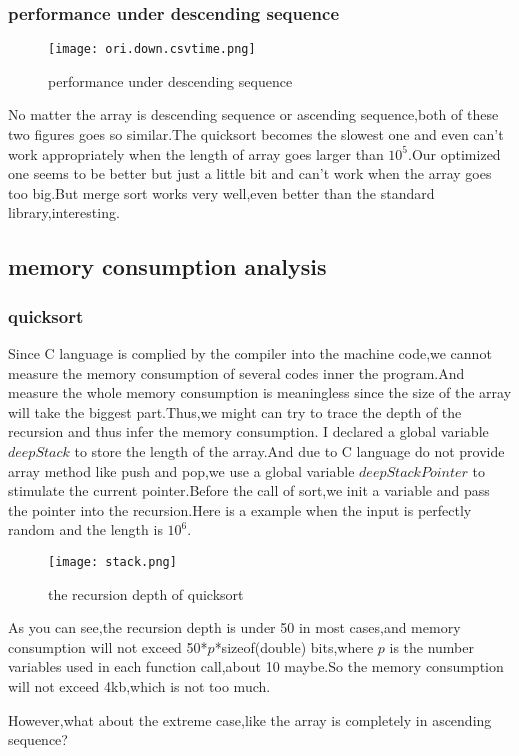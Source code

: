 \documentclass[11pt]{scrartcl} %
\begin{document}
	\subsubsection{performance under descending sequence }
	\begin{figure}[H]
		\centering
		\texttt{[image: ori.down.csvtime.png]}
		\caption{performance under descending sequence}
		\label{}
	\end{figure}
	No matter the array is descending sequence or ascending sequence,both of these two figures goes so similar.The quicksort becomes the slowest one and even can't work appropriately when the length of array goes larger than $10^5$.Our optimized one seems to be better but just a little bit and can't work when the array goes too big.But merge sort works very well,even better than the standard library,interesting.
	\subsection{memory consumption analysis}
	\subsubsection{quicksort}
	Since C language is complied by the compiler into the machine code,we cannot measure the memory consumption of several codes inner the program.And measure the whole memory consumption is meaningless since the size of the array will take the biggest part.Thus,we might can try to trace the depth of the recursion and thus infer the memory consumption.
	I declared a global variable $deepStack$ to store the length of the array.And due to C language do not provide array method like push and pop,we use a global variable $deepStackPointer$ to stimulate the current pointer.Before the call of sort,we init a variable and pass the pointer into the recursion.Here is a example when the input is perfectly random and the length is $10^6$.
	\begin{figure}[H]
		\centering
		\texttt{[image: stack.png]}
		\caption{the recursion depth of quicksort}
		\label{10}
	\end{figure}
	As you can see,the recursion depth is under 50 in most cases,and memory consumption will not exceed 50*$p$*sizeof(double) bits,where $p$ is the number variables used in each function call,about 10 maybe.So the memory consumption will not exceed 4kb,which is not too much.
	
	However,what about the extreme case,like the array is completely in ascending sequence?
\end{document}
